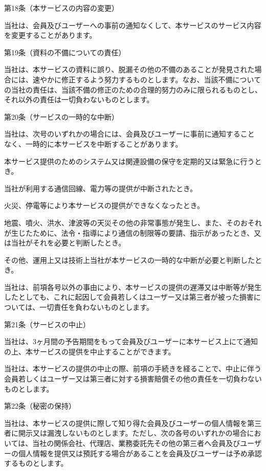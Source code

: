 第18条（本サービスの内容の変更）

    当社は、会員及びユーザーへの事前の通知なくして、本サービスのサービス内容を変更することがあります。

第19条（資料の不備についての責任）

    当社は、本サービスの資料に誤り、脱漏その他の不備のあることが発見された場合には、速やかに修正するよう努力するものとします。なお、当該不備についての当社の責任は、当該不備の修正のための合理的努力のみに限られるものとし、それ以外の責任は一切負わないものとします。

第20条（サービスの一時的な中断）

    当社は、次号のいずれかの場合には、会員及びユーザーに事前に通知すること なく、一時的に本サービスを中断することがあります。

        本サービス提供のためのシステム又は関連設備の保守を定期的又は緊急に行うとき。

        当社が利用する通信回線、電力等の提供が中断されたとき。

        火災、停電等により本サービスの提供ができなくなったとき。

        地震、噴火、洪水、津波等の天災その他の非常事態が発生し、また、そのおそれが生じたために、法令・指導により通信の制限等の要請、指示があったとき、又は当社がそれを必要と判断したとき。

        その他、運用上又は技術上当社が本サービスの一時的な中断が必要と判断したとき。

    当社は、前項各号以外の事由により、本サービスの提供の遅滞又は中断等が発生したとしても、これに起因して会員若しくはユーザー又は第三者が被った損害については、一切責任を負わないものとします。

第21条（サービスの中止）

    当社は、3ヶ月間の予告期間をもって会員及びユーザーに本サービス上にて通知の上、本サービスの提供を中止することができます。

    当社は、本サービスの提供の中止の際、前項の手続きを経ることで、中止に伴う会員若しくはユーザー又は第三者に対する損害賠償その他の責任を一切負わないものとします。

第22条（秘密の保持）

    当社は、本サービスの提供に際して知り得た会員及びユーザーの個人情報を第三者に開示又は漏洩しないものとします。ただし、次の各号のいずれかの場合においては、当社の関係会社、代理店、業務委託先その他の第三者へ会員及びユーザーの個人情報を提供又は預託する場合があることを会員及びユーザーは予め承認するものとします。

